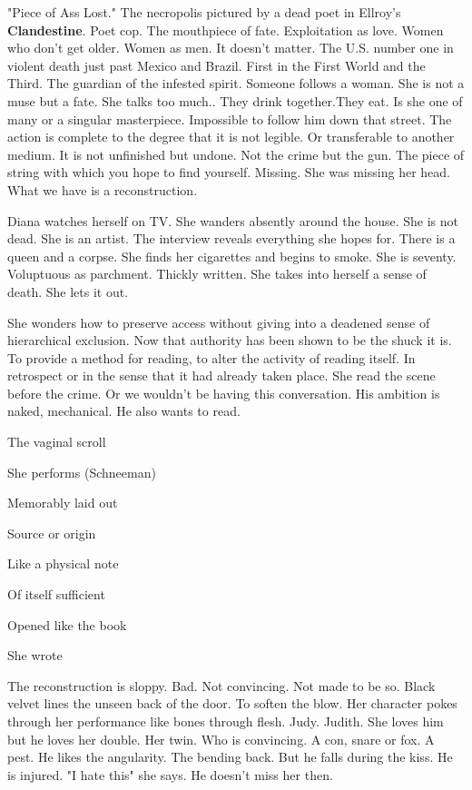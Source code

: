 "Piece of Ass Lost." The necropolis pictured by a dead poet in Ellroy's
\textbf{Clandestine}. Poet cop. The mouthpiece of fate. Exploitation as
love. Women who don't get older. Women as men. It doesn't matter. The
U.S. number one in violent death just past Mexico and Brazil. First in
the First World and the Third. The guardian of the infested spirit.
Someone follows a woman. She is not a muse but a fate. She talks too
much.. They drink together.They eat. Is she one of many or a singular
masterpiece. Impossible to follow him down that street. The action is
complete to the degree that it is not legible. Or transferable to
another medium. It is not unfinished but undone. Not the crime but the
gun. The piece of string with which you hope to find yourself. Missing.
She was missing her head. What we have is a reconstruction.

Diana watches herself on TV. She wanders absently around the house. She
is not dead. She is an artist. The interview reveals everything she
hopes for. There is a queen and a corpse. She finds her cigarettes and
begins to smoke. She is seventy. Voluptuous as parchment. Thickly
written. She takes into herself a sense of death. She lets it out.

She wonders how to preserve access without giving into a deadened sense
of hierarchical exclusion. Now that authority has been shown to be the
shuck it is. To provide a method for reading, to alter the activity of
reading itself. In retrospect or in the sense that it had already taken
place. She read the scene before the crime. Or we wouldn't be having
this conversation. His ambition is naked, mechanical. He also wants to
read.

The vaginal scroll

She performs (Schneeman)

Memorably laid out

Source or origin

Like a physical note

Of itself sufficient

Opened like the book

She wrote

The reconstruction is sloppy. Bad. Not convincing. Not made to be so.
Black velvet lines the unseen back of the door. To soften the blow. Her
character pokes through her performance like bones through flesh. Judy.
Judith. She loves him but he loves her double. Her twin. Who is
convincing. A con, snare or fox. A pest. He likes the angularity. The
bending back. But he falls during the kiss. He is injured. "I hate this"
she says. He doesn't miss her then.

